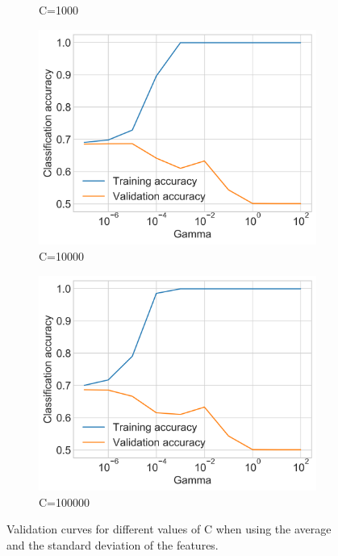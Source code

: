\begin{figure}[h]
\begin{subfigure}{0.5\textwidth}
        \caption{C=1000}
        \label{figure:svm_validation_std_C_1000}
    \end{subfigure}
    \begin{subfigure}{0.5\textwidth}
        \centering
        \includegraphics[width=\textwidth]{figures/charts/training_with_std/svm_validation_C_10000.png}
        \caption{C=10000}
        \label{figure:svm_validation_std_C_10000}
    \end{subfigure}
    \begin{subfigure}{0.5\textwidth}
        \centering
        \includegraphics[width=\textwidth]{figures/charts/training_with_std/svm_validation_C_100000.png}
        \caption{C=100000}
        \label{figure:svm_validation_std_C_100000}
    \end{subfigure}
    \caption{Validation curves for different values of C when using the average and the standard deviation of the features.}
    \label{figure:svm_validation_std}
\end{figure}
